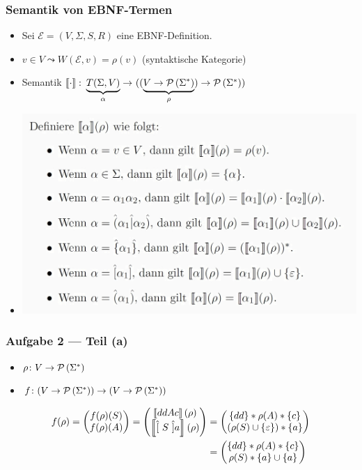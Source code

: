\documentclass{beamer}
\newcommand{\byp}[1]{\hat{[} \ #1 \ \hat{]}}
\newcommand{\sem}[1]{\left\llbracket #1 \right\rrbracket}
\begin{document}
\begin{frame} \frametitle{Semantik von EBNF-Termen}
	\begin{itemize}
		\item Sei $\mathcal{E} = (V,\Sigma,S,R)$ eine EBNF-Definition.
		\item $v \in V \leadsto W(\mathcal{E},v) = \rho(v)$ (syntaktische Kategorie)
		\item Semantik $\abb{\sem{\cdot}}{\underbrace{T(\Sigma, V)}_{\alpha}}{((\underbrace{V \to \pows{\Sigma^\ast}}_{\rho}) \to \pows{\Sigma^\ast})}$
		\item[] \includegraphics[width=.9\textwidth]{tut03_semantik.jpg}
	\end{itemize}	
\end{frame}

\begin{frame} \frametitle{Aufgabe 2 --- Teil (a)}
	\begin{itemize}
		\item $\rho \colon V \to \mathcal{P}\left( \Sigma^\ast \right)$
		\item $f \colon (V \to \mathcal{P}\left( \Sigma^\ast \right)) \to (V \to \mathcal{P}\left( \Sigma^\ast \right))$
	\end{itemize}
	\pause
	\begin{align*}
		f(\rho) = \begin{pmatrix} f(\rho)(S) \\ f(\rho)(A) \end{pmatrix} 
		= \begin{pmatrix} \sem{ddAc}(\rho) \\ \sem{\byp{S}a}(\rho) \end{pmatrix} 
		&= \begin{pmatrix}
			\menge{dd} * \rho(A) * \menge{c} \\ \brackets{\rho(S) \cup \menge{\epsilon}} * \menge{a}
		\end{pmatrix} \\
		&= \begin{pmatrix}
			\menge{dd} * \rho(A) * \menge{c} \\ \rho(S) * \menge{a} \cup \menge{a}
		\end{pmatrix}
	\end{align*}
\end{frame}
\end{document}
